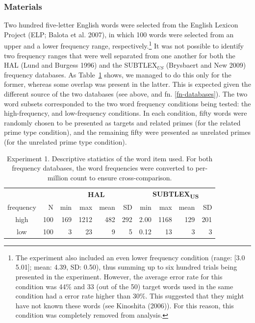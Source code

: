 \documentclass[
]{interact}
\begin{document}
\subsubsection{Materials}\label{sec-exp1-methods-materials}

Two hundred five-letter English words were selected from the English
Lexicon Project (ELP; Balota et al. 2007), in which 100 words were
selected from an upper and a lower frequency range,
respectively.\footnote{The experiment also included an even lower
  frequency condition (range: {[}3.0 5.01{]}; mean: 4.39, SD: 0.50),
  thus summing up to six hundred trials being presented in the
  experiment. However, the average error rate for this condition was
  44\% and 33 (out of the 50) target words used in the same condition
  had a error rate higher than 30\%. This suggested that they might have
  not known these words (see Kinoshita (2006)). For this reason, this
  condition was completely removed from analysis.} It was not possible
to identify two frequency ranges that were well separated from one
another for both the HAL (Lund and Burgess 1996) and the
SUBTLEX\(_{US}\) (Brysbaert and New 2009) frequency databases. As
Table~\ref{tbl-words_exp1} shows, we managed to do this only for the
former, whereas some overlap was present in the latter. This is expected
given the different source of the two databases (see above, and fn.
\ref{fn-databases}). The two word subsets corresponded to the two word
frequency conditions being tested: the high-frequency, and low-frequency
conditions. In each condition, fifty words were randomly chosen to be
presented as targets and related primes (for the related prime type
condition), and the remaining fifty were presented as unrelated primes
(for the unrelated prime type condition).

\begin{longtable}{crrrrrrrrr}

\caption{\label{tbl-words_exp1}Experiment 1. Descriptive statistics of
the word item used. For both frequency databases, the word frequencies
were converted to per-million count to ensure cross-comparison.}

\tabularnewline

\toprule
 &  & \multicolumn{4}{c}{\textbf{HAL}} & \multicolumn{4}{c}{\textbf{SUBTLEX\textsubscript{US}}} \\ 
\cmidrule(lr){3-6} \cmidrule(lr){7-10}
frequency & N & min & max & mean & SD & min & max & mean & SD \\ 
\midrule\addlinespace[2.5pt]
high & 100 & 169 & 1212 & 482 & 292 & 2.00 & 1168 & 129 & 201 \\ 
low & 100 & 3 & 23 & 9 & 5 & 0.12 & 13 & 3 & 3 \\ 
\bottomrule

\end{longtable}
\end{document}
